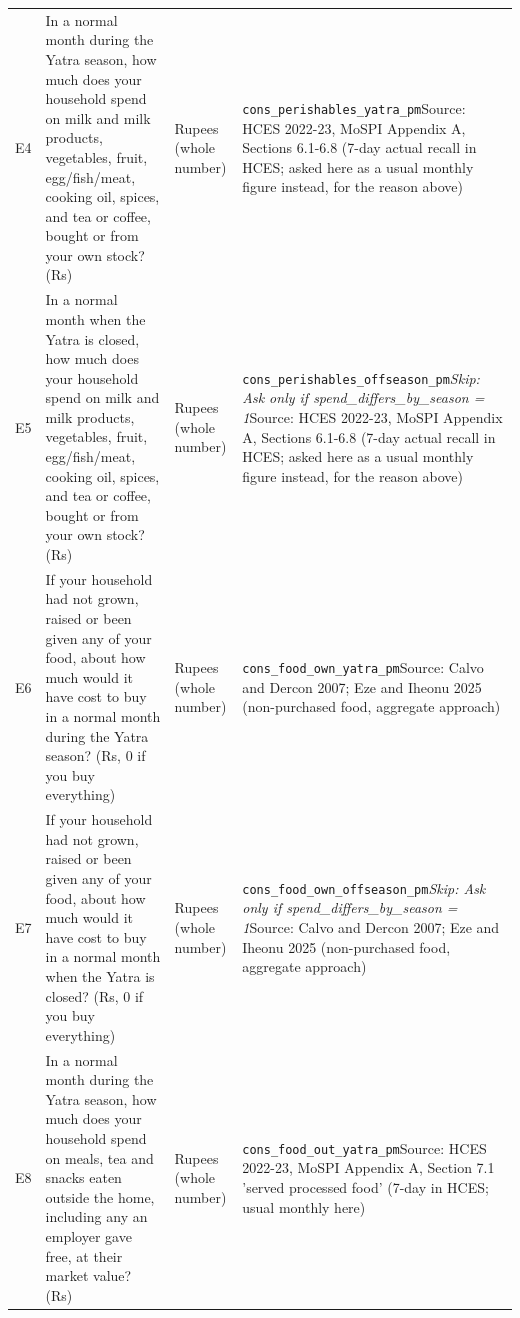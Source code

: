 \documentclass[10pt]{article}
\begin{document}
{\begin{longtable}{p{0.8cm}p{6.4cm}p{3.6cm}p{5.8cm}}
E4 & In a normal month during the Yatra season, how much does your household spend on milk and milk products, vegetables, fruit, egg/fish/meat, cooking oil, spices, and tea or coffee, bought or from your own stock? (Rs) & Rupees (whole number) & \texttt{cons\_perishables\_yatra\_pm}\newline Source: HCES 2022-23, MoSPI Appendix A, Sections 6.1-6.8 (7-day actual recall in HCES; asked here as a usual monthly figure instead, for the reason above) \\
E5 & In a normal month when the Yatra is closed, how much does your household spend on milk and milk products, vegetables, fruit, egg/fish/meat, cooking oil, spices, and tea or coffee, bought or from your own stock? (Rs) & Rupees (whole number) & \texttt{cons\_perishables\_offseason\_pm}\newline \textit{Skip: Ask only if spend\_differs\_by\_season = 1}\newline Source: HCES 2022-23, MoSPI Appendix A, Sections 6.1-6.8 (7-day actual recall in HCES; asked here as a usual monthly figure instead, for the reason above) \\
E6 & If your household had not grown, raised or been given any of your food, about how much would it have cost to buy in a normal month during the Yatra season? (Rs, 0 if you buy everything) & Rupees (whole number) & \texttt{cons\_food\_own\_yatra\_pm}\newline Source: Calvo and Dercon 2007; Eze and Iheonu 2025 (non-purchased food, aggregate approach) \\
E7 & If your household had not grown, raised or been given any of your food, about how much would it have cost to buy in a normal month when the Yatra is closed? (Rs, 0 if you buy everything) & Rupees (whole number) & \texttt{cons\_food\_own\_offseason\_pm}\newline \textit{Skip: Ask only if spend\_differs\_by\_season = 1}\newline Source: Calvo and Dercon 2007; Eze and Iheonu 2025 (non-purchased food, aggregate approach) \\
E8 & In a normal month during the Yatra season, how much does your household spend on meals, tea and snacks eaten outside the home, including any an employer gave free, at their market value? (Rs) & Rupees (whole number) & \texttt{cons\_food\_out\_yatra\_pm}\newline Source: HCES 2022-23, MoSPI Appendix A, Section 7.1 'served processed food' (7-day in HCES; usual monthly here) \\

\end{longtable}}
\end{document}
